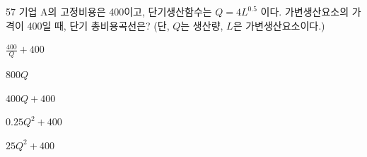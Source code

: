 \begin{question}{57}
기업 A의 고정비용은 400이고, 단기생산함수는 $Q=4L^{0.5}$ 이다. 가변생산요소의 가격이 400일 때, 단기 총비용곡선은? (단, $Q$는 생산량, $L$은 가변생산요소이다.)
\begin{choices}
  \item $\frac{400}{Q}+400$
  \item $800Q$
  \item $400Q+400$
  \item $0.25Q^{2}+400$
  \item $25Q^{2}+400$
\end{choices}
\end{question}
